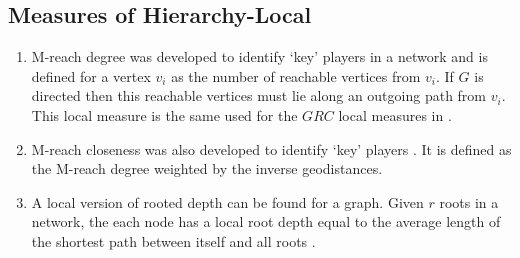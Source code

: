 \documentclass[3p,times]{elsarticle}
\begin{document}
\subsection{Measures of Hierarchy-Local}
\begin{enumerate}
	\item M-reach degree was developed to identify `key' players in a network \cite{key} and is defined for a vertex $v_{i}$ as the number of reachable vertices from $v_{i}.$ If 
		$G$ is directed then this reachable vertices must lie along an outgoing path from $v_{i}$. This local measure is the same used for the $GRC$ local measures in \cite{GRC}.  
	\item M-reach closeness was also developed to identify `key' players \cite{key}. It is defined as the M-reach degree weighted by the inverse geodistances. 
	\item A local version of rooted depth can be found for a graph. Given $r$ roots in a network, the each node has a local root depth equal to the average length of the shortest path between itself and all roots \cite{depth}.
\end{enumerate}
\end{document}
